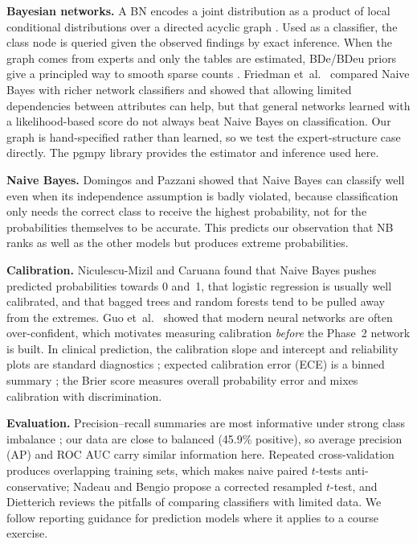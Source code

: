 \documentclass[conference]{IEEEtran}
\begin{document}
\textbf{Bayesian networks.} A BN encodes a joint distribution as a product of local conditional distributions over a directed acyclic graph \cite{pearl1988}. Used as a classifier, the class node is queried given the observed findings by exact inference. When the graph comes from experts and only the tables are estimated, BDe/BDeu priors give a principled way to smooth sparse counts \cite{heckerman1995}. Friedman et~al.\ \cite{friedman1997} compared Naive Bayes with richer network classifiers and showed that allowing limited dependencies between attributes can help, but that general networks learned with a likelihood-based score do not always beat Naive Bayes on classification. Our graph is hand-specified rather than learned, so we test the expert-structure case directly. The pgmpy library \cite{ankan2015} provides the estimator and inference used here.

\textbf{Naive Bayes.} Domingos and Pazzani \cite{domingos1997} showed that Naive Bayes can classify well even when its independence assumption is badly violated, because classification only needs the correct class to receive the highest probability, not for the probabilities themselves to be accurate. This predicts our observation that NB ranks as well as the other models but produces extreme probabilities.

\textbf{Calibration.} Niculescu-Mizil and Caruana \cite{niculescu2005} found that Naive Bayes pushes predicted probabilities towards 0 and~1, that logistic regression is usually well calibrated, and that bagged trees and random forests tend to be pulled away from the extremes. Guo et~al.\ \cite{guo2017} showed that modern neural networks are often over-confident, which motivates measuring calibration \emph{before} the Phase~2 network is built. In clinical prediction, the calibration slope and intercept and reliability plots are standard diagnostics \cite{steyerberg2010,vancalster2019}; expected calibration error (ECE) is a binned summary \cite{naeini2015}; the Brier score \cite{brier1950} measures overall probability error and mixes calibration with discrimination.

\textbf{Evaluation.} Precision--recall summaries are most informative under strong class imbalance \cite{saito2015}; our data are close to balanced (45.9\% positive), so average precision (AP) and ROC AUC carry similar information here. Repeated cross-validation produces overlapping training sets, which makes naive paired $t$-tests anti-conservative; Nadeau and Bengio \cite{nadeau2003} propose a corrected resampled $t$-test, and Dietterich \cite{dietterich1998} reviews the pitfalls of comparing classifiers with limited data. We follow reporting guidance for prediction models \cite{collins2015} where it applies to a course exercise.
\end{document}
